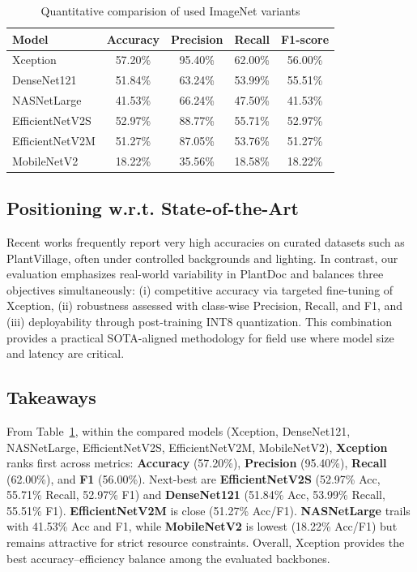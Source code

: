 \documentclass[12pt, a4paper]{report}
\begin{document}
\begin{table}[H]
    \centering
    \small
    \renewcommand{\arraystretch}{1.15}
    \begin{tabular}{|l|c|c|c|c|}
        \hline
        \textbf{Model} & \textbf{Accuracy} & \textbf{Precision} & \textbf{Recall} & \textbf{F1-score} \\
        \hline
        Xception & 57.20\% & 95.40\% & 62.00\% & 56.00\% \\
        DenseNet121 & 51.84\% & 63.24\% & 53.99\% & 55.51\% \\
        NASNetLarge & 41.53\% & 66.24\% & 47.50\% & 41.53\% \\
        EfficientNetV2S & 52.97\% & 88.77\% & 55.71\% & 52.97\% \\
        EfficientNetV2M & 51.27\% & 87.05\% & 53.76\% & 51.27\% \\
        MobileNetV2 & 18.22\% & 35.56\% & 18.58\% & 18.22\% \\
        \hline
    \end{tabular}
    \caption{Quantitative comparision of used ImageNet variants}
    \label{tab:metric_scores}
\end{table}

\subsection*{Positioning w.r.t. State-of-the-Art}
\noindent
Recent works frequently report very high accuracies on curated datasets such as PlantVillage, often under controlled backgrounds and lighting. In contrast, our evaluation emphasizes real-world variability in PlantDoc and balances three objectives simultaneously: (i) competitive accuracy via targeted fine-tuning of Xception, (ii) robustness assessed with class-wise Precision, Recall, and F1, and (iii) deployability through post-training INT8 quantization. This combination provides a practical SOTA-aligned methodology for field use where model size and latency are critical.

\subsection*{Takeaways}
\noindent
From Table~\ref{tab:metric_scores}, within the compared models (Xception, DenseNet121, NASNetLarge, EfficientNetV2S, EfficientNetV2M, MobileNetV2), \textbf{Xception} ranks first across metrics: \textbf{Accuracy} (57.20\%), \textbf{Precision} (95.40\%), \textbf{Recall} (62.00\%), and \textbf{F1} (56.00\%). Next-best are \textbf{EfficientNetV2S} (52.97\% Acc, 55.71\% Recall, 52.97\% F1) and \textbf{DenseNet121} (51.84\% Acc, 53.99\% Recall, 55.51\% F1). \textbf{EfficientNetV2M} is close (51.27\% Acc/F1). \textbf{NASNetLarge} trails with 41.53\% Acc and F1, while \textbf{MobileNetV2} is lowest (18.22\% Acc/F1) but remains attractive for strict resource constraints. Overall, Xception provides the best accuracy–efficiency balance among the evaluated backbones.
\newpage
\end{document}
